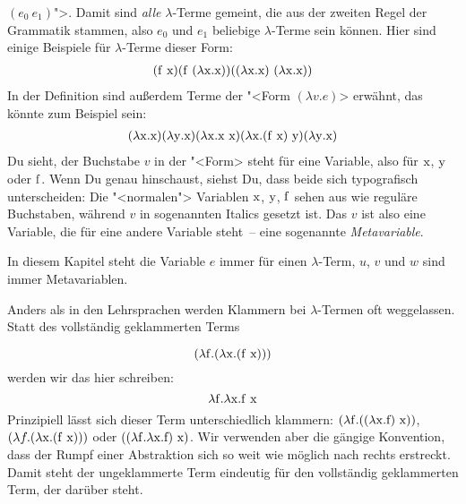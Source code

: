 $(e_0~e_1)$">. Damit sind \emph{alle} $\lambda$-Terme gemeint, die aus der
zweiten Regel der Grammatik stammen, also $e_0$ und $e_1$ beliebige
$\lambda$-Terme sein können.  Hier sind einige Beispiele für
$\lambda$-Terme dieser Form:
%
\begin{displaymath}
  \begin{array}{c}
    (\mathrm f~\mathrm x)
    (\mathrm f~(\lambda \mathrm x.\mathrm x))
    ((\lambda \mathrm x.\mathrm x)~(\lambda \mathrm x.\mathrm x))
  \end{array}
\end{displaymath}
%
In der Definition sind außerdem Terme der "<Form $(\lambda v.e)$>
erwähnt, das könnte zum Beispiel sein:
%
\begin{displaymath}
  \begin{array}{c}
    (\lambda \mathrm x.\mathrm x)
    (\lambda \mathrm y.\mathrm x)
    (\lambda \mathrm x.\mathrm x~\mathrm x)
    (\lambda \mathrm x.(\mathrm f~\mathrm x)~\mathrm y)
    (\lambda \mathrm y.\mathrm x)
  \end{array}
\end{displaymath}
%
Du sieht, der Buchstabe $v$ in der "<Form> steht für eine Variable,
also für $\mathrm x$, $\mathrm y$ oder $\mathrm f$.  Wenn Du genau hinschaust,
siehst Du, dass beide sich typografisch unterscheiden: Die
"<normalen"> Variablen $\mathrm x$, $\mathrm y$, $\mathrm f$ sehen aus wie
reguläre Buchstaben, während $v$ in sogenannten Italics gesetzt ist.
Das $v$ ist also eine Variable, die für eine andere Variable steht~--
eine sogenannte \textit{Metavariable}.

In diesem Kapitel steht die Variable $e$ immer für einen
$\lambda$-Term, $u$, $v$ und $w$ sind immer Metavariablen.

Anders als in den Lehrsprachen werden Klammern bei $\lambda$-Termen
oft weggelassen.  Statt des vollständig geklammerten Terms

\begin{displaymath}
  (\lambda \mathrm f.(\lambda \mathrm x.(\mathrm f~\mathrm x)))
\end{displaymath}
%
werden wir das hier schreiben: 
%
\begin{displaymath}
  \lambda \mathrm f.\lambda \mathrm x.\mathrm f~\mathrm x
\end{displaymath}
%
Prinzipiell lässt sich dieser Term unterschiedlich
klammern: $(\lambda \mathrm f.((\lambda \mathrm x.\mathrm f)~\mathrm x))$, $(\lambda
f.(\lambda \mathrm x.(\mathrm f~\mathrm x)))$ oder $((\lambda \mathrm f.\lambda
\mathrm x.\mathrm f)~\mathrm x)$.  Wir verwenden aber die gängige Konvention,
dass der Rumpf einer Abstraktion sich so weit wie möglich nach
rechts erstreckt.   Damit steht der ungeklammerte Term eindeutig für
den vollständig geklammerten Term, der darüber steht.

